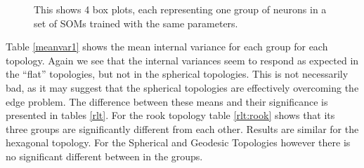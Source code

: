 \begin{figure}[hbt]
\label{boxplot}
\centering
{}
\caption{This shows 4 box plots, each representing one group of neurons in a set
of SOMs trained with the same parameters.}
\end{figure}

Table \ref{meanvar1} shows the mean internal variance for each group for each
topology. Again we see that the internal variances seem to respond as expected
in the ``flat'' topologies, but not in the spherical topologies.  This is not
necessarily bad, as it may suggest that the spherical topologies are
effectively overcoming the edge problem.  The difference between these means
and their significance is presented in tables \ref{rlt}.  For the rook
topology table \ref{rlt:rook} shows that its three groups are significantly
different from each other. Results are similar for the hexagonal topology. For
the Spherical and Geodesic Topologies however there is no significant
different between in the groups.


